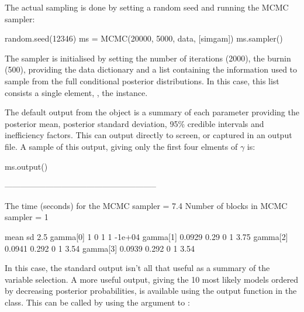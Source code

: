 \documentclass[article]{jss}
\begin{document}
The actual sampling is done by setting a random seed and running the
MCMC sampler:
\begin{Code}
random.seed(12346)
ms = MCMC(20000, 5000, data, [simgam])
ms.sampler()
\end{Code}

The  sampler is initialised by setting the number of
iterations (2000), the burnin (500), providing the data dictionary
 and a list containing the information used to sample from
the full conditional posterior distributions. In this case, this list
consists a single element, , the 
instance.

The default output from the  object is a summary of each
parameter providing the posterior mean, posterior standard deviation,
95\% credible intervals and inefficiency factors. This can output
directly to screen, or captured in an output file. A sample of this
output, giving only the first four elments of $\gamma$ is:

\begin{CodeChunk}
\begin{CodeInput}
ms.output()
\end{CodeInput}
\begin{CodeOutput}
--------------------------------------------------------

The time (seconds) for the MCMC sampler =  7.4
Number of blocks in MCMC sampler =  1

                    mean          sd         2.5%
    gamma[0]           1           0            1           1       -1e+04
    gamma[1]      0.0929        0.29            0           1         3.75
    gamma[2]      0.0941       0.292            0           1         3.54
    gamma[3]      0.0939       0.292            0           1         3.54
\end{CodeOutput}
\end{CodeChunk}

In this case, the standard output isn't all that useful as a summary
of the variable selection. A more useful output, giving the 10 most
likely models ordered by decreasing posterior probabilities, is
available using the output function in the 
class. This can be called by using the  argument to
:
\end{document}
